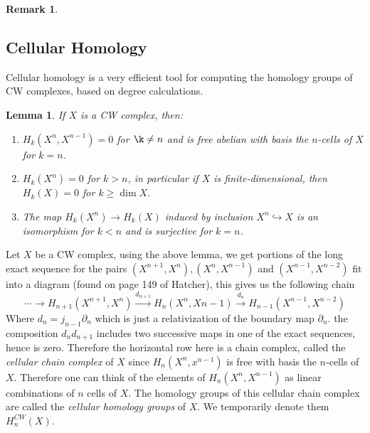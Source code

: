 \documentclass[11pt,a4paper]{article}
\theoremstyle{definition}
\newtheorem{remark}[definition]{Remark}
\theoremstyle{plain}
\newtheorem{lemma}[definition]{Lemma}
\theoremstyle{remark}
\begin{document}
\begin{remark}
\subsection{Cellular Homology} 
Cellular homology is a very efficient tool for computing the homology groups of CW complexes, based on degree calculations.

\begin{lemma}
  If $X$ is a CW complex, then: 
  \begin{enumerate}[label = (\alph*)]
    \item $H_k(X^n, X^{n-1}) = 0$ for $\k \neq n$ and is free abelian with basis the $n$-cells of $X$ for $k = n$. 
    
    \item $H_k (X^n) = 0$ for $k > n$, in particular if $X$ is finite-dimensional, then $H_k(X) = 0$ for $k \geq \dim X$. 
    
    \item The map $H_k(X^n) \to H_k(X)$ induced by inclusion $X^n \hookrightarrow X$ is an isomorphism for $k < n$ and is 
    surjective for $k = n$. 
  \end{enumerate}
\end{lemma}

Let $X$ be a CW complex, using the above lemma, we get portions of the long exact sequence for the pairs $(X^{n+1}, X^n), (X^n, X^{n-1})$ and $(X^{n-1}, X^{n-2})$ 
fit into a diagram (found on page 149 of Hatcher), this gives us the following chain  
$$\cdots \to H_{n+1} (X^{n+1}, X^n) \xrightarrow{d_{n+1}} H_n (X^n, X{n-1}) \xrightarrow{d_n} H_{n-1}(X^{n-1}, X^{n-2})$$
Where $d_n = j_{n-1} \partial_n$ which is just a relativization of the boundary map $\partial_n$. 
the composition $d_n d_{n+1}$ includes two successive maps in one of the exact sequences, hence is zero. Therefore the horizontal row here is a chain complex, 
called the \emph{cellular chain complex} of $X$ since $H_n(X^n, x^{n-1})$ is free with basis the $n$-cells of $X$. Therefore one can think 
of the elements of $H_n(X^n, X^{n-1})$ as linear combinations of $n$ cells of $X$. The homology groups of this cellular chain 
complex are called the \emph{cellular homology groups} of $X$. We temporarily denote them $H_n^{CW} (X)$. 


\end{remark}
\end{document}

